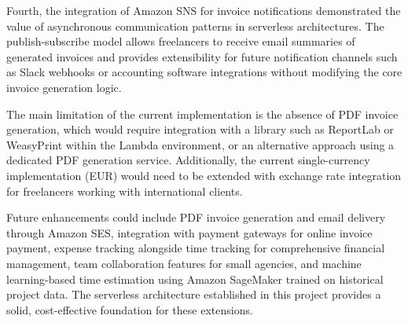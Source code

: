 \documentclass[conference]{IEEEtran}
\begin{document}
Fourth, the integration of Amazon SNS for invoice notifications demonstrated the value of asynchronous communication patterns in serverless architectures. The publish-subscribe model allows freelancers to receive email summaries of generated invoices and provides extensibility for future notification channels such as Slack webhooks or accounting software integrations without modifying the core invoice generation logic.

The main limitation of the current implementation is the absence of PDF invoice generation, which would require integration with a library such as ReportLab or WeasyPrint within the Lambda environment, or an alternative approach using a dedicated PDF generation service. Additionally, the current single-currency implementation (EUR) would need to be extended with exchange rate integration for freelancers working with international clients.

Future enhancements could include PDF invoice generation and email delivery through Amazon SES, integration with payment gateways for online invoice payment, expense tracking alongside time tracking for comprehensive financial management, team collaboration features for small agencies, and machine learning-based time estimation using Amazon SageMaker trained on historical project data. The serverless architecture established in this project provides a solid, cost-effective foundation for these extensions.
\end{document}
